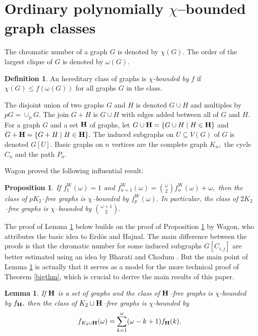 \documentclass{article}
\theoremstyle{plain}
\newtheorem{lem}[thm]{Lemma}
\newtheorem{prop}[thm]{Proposition}
\theoremstyle{definition}
\newtheorem{defn}{Definition}
\begin{document}
\section{Ordinary polynomially $\chi$--bounded graph classes}

The chromatic number of a graph $G$ is denoted by $\chi(G).$ The order of the largest clique of $G$ is denoted by $\omega(G).$

\begin{defn} An hereditary class of graphs is \emph{$\chi$-bounded by $f$} if $\chi(G)\leq f(\omega(G))$ for all graphs $G$ in the class.
\end{defn}

The disjoint union of two graphs $G$ and $H$ is denoted $G \cup H$ and multiples by $pG=\cup_p G.$
The join $G+H$ is $G \cup H$ with edges added between all of $G$ and $H.$ For a graph $G$ and a set $\bf{H}$ of graphs, let $ G \cup {\bf H  } = \{ G \cup H \mid H \in {\bf H} \}$ and  $ G + {\bf H  } = \{ G + H \mid H \in {\bf H} \}.$ The induced subgraphs on $U\subseteq V(G)$ of $G$ is denoted $G[U].$ Basic graphs on $n$ vertices are the complete graph $K_n,$ the cycle $C_n$ and the path $P_n.$

Wagon \cite{W80} proved the following influential result:
\begin{prop}\label{wagon} If $f_1^{\mathrm{W}}(\omega)=1$ and $f_{n+1}^{\mathrm{W}}(\omega)={ \omega \choose 2} f_n^{\mathrm{W}}(\omega) + \omega,$ then the class of $pK_2$--free graphs is $\chi$--bounded by $f_p^{\mathrm{W}}(\omega).$ In particular, the class of $2K_2$--free graphs is $\chi$--bounded by ${\omega +1 \choose 2}.$
\end{prop}
The proof of Lemma \ref{K2extend} below builds on the proof of Proposition \ref{wagon} by Wagon, who attributes the basic idea to Erdös and Hajnal. The main difference between the proofs is that the chromatic number for some induced subgraphs $G[C_{i,j}]$ are better estimated using an idea by Bharati and Chodum \cite{BC18}. But the main point of Lemma \ref{K2extend} is actually that it serves as a model for the more technical proof of Theorem \ref{bigthm}, which is crucial to derive the main results of this paper.

\begin{lem}\label{K2extend}
If ${\bf H}$ is a set of graphs and the class of ${\bf H}$--free graphs is  $\chi$-bounded by $f_{\bf H},$ then the class of  $K_2 \cup {\bf H  } $--free graphs is $\chi$-bounded by
\[
f_{K_2 \cup {\bf H  } }(\omega) = \sum_{k=1}^{\omega}  (\omega-k+1)  f_{{\bf H  } }(k).
\]
\end{lem}
\end{document}
